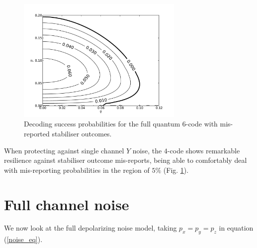 \begin{figure}[htb]
  \begin{center}
    \includegraphics[width=8cm]{assets/y_lying.pdf}
  \end{center}
  \caption{Decoding success probabilities for the full quantum $6$-code with mis-reported stabiliser outcomes.}
  \label{y_lying}
\end{figure}

When protecting against single channel $Y$ noise, the $4$-code shows remarkable resilience against stabiliser outcome mis-reports, being able to comfortably deal with mis-reporting probabilities in the region of $5\%$ (Fig. \ref{y_lying}).

\section{Full channel noise}

We now look at the full depolarizing noise model, taking $p_x = p_y = p_z$ in equation (\ref{noise_eq}). 


